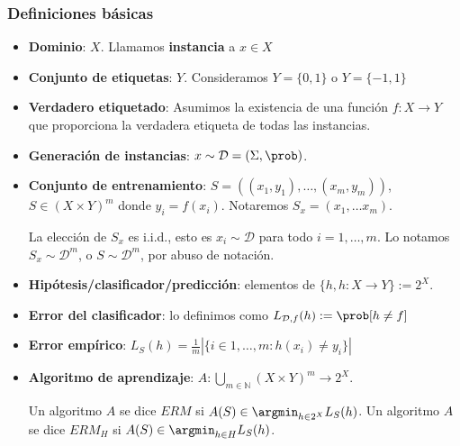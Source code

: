 \begin{frame}\frametitle{Definiciones básicas}
 \begin{itemize}
  \item \textbf{Dominio}: $X$. Llamamos \textbf{instancia} a $x\in X$

  \item \textbf{Conjunto de etiquetas}: $Y$. Consideramos $Y = \{0,1\}$ o $Y=\{-1,1\}$

  \item \textbf{Verdadero etiquetado}: Asumimos la existencia de una función ${f: X \rightarrow Y}$ 
  que proporciona la verdadera etiqueta de todas las instancias.

  \item \textbf{Generación de instancias}: $x\sim \mathcal{D} = (\Sigma, \prob)$.

  \item \textbf{Conjunto de entrenamiento}: $S = ((x_1,y_1), \ldots, (x_m,y_m))$, $S\in (X \times Y)^m$ donde
  $y_i = f(x_i)$. Notaremos $S_x = (x_1, \ldots x_m)$.

  La elección de $S_x$ es i.i.d., esto es $x_i \sim \mathcal{D}$ para todo $i=1, \ldots, m$.
  Lo notamos $S_x \sim \mathcal{D}^m$, o $S \sim \mathcal{D}^m$, por abuso de notación. 

  \item \textbf{Hipótesis/clasificador/predicción}: elementos de $\{h, h:X \rightarrow Y\} := 2^{X}$. 

  \item \textbf{Error del clasificador}: lo definimos como $L_{\mathcal{D},f}(h) :=  \prob [h \neq f]$

  \item \textbf{Error empírico}: $L_S(h) = \frac{1}{m}|\{i\in {1,\ldots, m}: h(x_i) \neq y_i\}|$
  
  \item \textbf{Algoritmo de aprendizaje}: $A: \underset{m\in \mathbb{N}}{\bigcup} (X\times Y)^m \rightarrow 2^{X}$. 
  
  Un algoritmo $A$ se dice $ERM$ si $A(S) \in \argmin_{h\in 2^X} L_S(h)$.
  Un algoritmo $A$ se dice $ERM_H$ si $A(S) \in \argmin_{h\in H} L_S(h)$.
 \end{itemize}
\end{frame}

